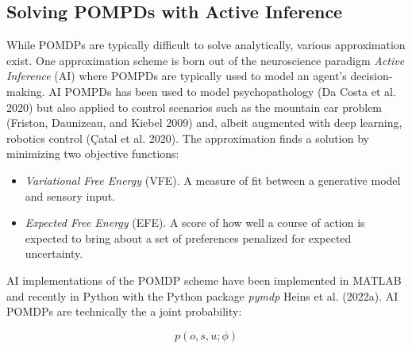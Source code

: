 \documentclass[
]{article}
\begin{document}
\subsection{Solving POMPDs with Active
Inference}\label{solving-pompds-with-active-inference}

While POMDPs are typically difficult to solve analytically, various
approximation exist. One approximation scheme is born out of the
neuroscience paradigm \emph{Active Inference} (AI) where POMPDs are
typically used to model an agent's decision-making. AI POMPDs has been
used to model psychopathology (Da Costa et al. 2020) but also applied to
control scenarios such as the mountain car problem (Friston, Daunizeau,
and Kiebel 2009) and, albeit augmented with deep learning, robotics
control (Çatal et al. 2020). The approximation finds a solution by
minimizing two objective functions:

\begin{itemize}
\item
  \emph{Variational Free Energy} (VFE). A measure of fit between a
  generative model and sensory input.
\item
  \emph{Expected Free Energy} (EFE). A score of how well a course of
  action is expected to bring about a set of preferences penalized for
  expected uncertainty.
\end{itemize}

AI implementations of the POMDP scheme have been implemented in MATLAB
and recently in Python with the Python package \emph{pymdp} Heins et al.
(2022a). AI POMDPs are technically the a joint probability:

\[
p(o,s,u;\phi)
\]
\end{document}

